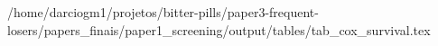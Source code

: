 /home/darciogm1/projetos/bitter-pills/paper3-frequent-losers/papers_finais/paper1_screening/output/tables/tab_cox_survival.tex